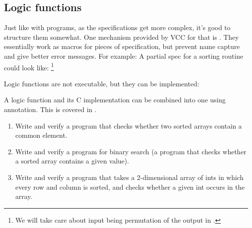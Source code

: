 \subsection{Logic functions}
Just like with programs, as the specifications get more complex,
it's good to structure them somewhat.
One mechanism provided by VCC for that is .
They essentially work as macros for pieces of specification,
but prevent name capture and give better error messages.
For example:
\noindent
A partial spec for a sorting routine could look like:%
\footnote{We will take care about input being permutation of the output in .}

Logic functions are not executable, but they can be implemented:

A logic function and its C implementation can be combined into one using
 annotation.  This is covered in .
 
\begin{enumerate}

\item
Write and verify a program that checks whether two sorted arrays
contain a common element.
\item
Write and verify a program for binary search (a program
that checks whether a sorted array contains a given value).

\item 
Write and verify a program that takes a 2-dimensional array of ints in
which every row and column is sorted, and checks whether a given int
occurs in the array.
\end{enumerate}

